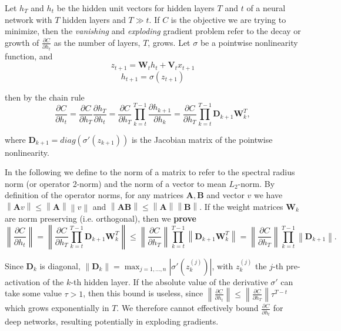 \documentclass{article} %
\newcommand{\matr}[1]{\mathbf{#1}}
\newcommand\norm[1]{\left\lVert#1\right\rVert}
\begin{document}
Let $h_T$ and $h_t$ be the hidden unit vectors for hidden layers $T$ and $t$ of a neural network with 
$T$ hidden layers and $T \gg t$. 
If $C$ is the objective we are trying to minimize, then the {\it{vanishing}} and {\it{exploding}} 
gradient problem refer to the decay or growth of $\frac{\partial C}{\partial h_t}$ as the 
number of layers, $T$, grows. Let $\sigma$ be a pointwise nonlinearity function, and
\begin{equation}
  z_{t+1} = \matr{W}_t h_t + \matr{V}_t x_{t+1}
\label{linoutput}
\end{equation}
\begin{equation}
  h_{t+1} = \sigma (z_{t+1})
\label{nonlinoutput}
\end{equation}

then by the chain rule
\begin{equation}
  \frac{\partial C}{\partial h_t} = \frac{\partial C}{\partial h_T} \frac{\partial h_T}{\partial h_t} 
  = \frac{\partial C}{\partial h_T} \prod_{k=t}^{T-1} \frac{\partial h_{k+1}}{\partial h_k} 
  = \frac{\partial C}{\partial h_T} \prod_{k=t}^{T-1} \matr{D}_{k+1} \matr{W}_k^T ,
\end{equation}

where $\matr{D}_{k+1} = diag(\sigma'(z_{k+1}))$ is the Jacobian matrix of the pointwise nonlinearity.

In the following we define to the norm of a matrix to refer to the spectral radius norm (or operator 2-norm)
and the norm of a vector to mean $L_2$-norm. By definition of the operator norms, 
for any matrices $\matr{A}, \matr{B}$ and vector $v$ we have $\norm{\matr{A}v} \leq \norm{\matr{A}} \norm{v}$ and $\norm{\matr{A}\matr{B}} \leq \norm{\matr{A}} \norm{\matr{B}}$.
If the weight matrices $\matr{W}_k$ are norm preserving (i.e. orthogonal), then we {\bf{prove}}
\begin{equation}
  \norm{ \frac{\partial C}{\partial h_t} } = \norm{ \frac{\partial C}{\partial h_T} 
  \prod_{k=t}^{T-1} \matr{D}_{k+1} \matr{W}_k^T } \leq \norm{\frac{\partial C}{\partial h_T}} 
  \prod_{k=t}^{T-1} \norm{ \matr{D}_{k+1} \matr{W}_k^T } 
  = \norm{ \frac{\partial C}{\partial h_T}} \prod_{k=t}^{T-1} \norm{\matr{D}_{k+1}} .
\label{bound}
\end{equation}

Since $\matr{D}_k$ is diagonal, $\norm{\matr{D}_k} = \max_{j=1, ..., n} |\sigma'(z_k^{(j)})|$,
with $z_k^{(j)}$ the $j$-th pre-activation of the $k$-th hidden layer.
If the absolute value of the derivative $\sigma'$ can take some value $\tau > 1$, then 
this bound is useless, since $\norm{\frac{\partial C}{\partial h_t}} 
\leq \norm{\frac{\partial C}{\partial h_T}} \tau^{T-t}$ which grows exponentially 
in $T$. We therefore cannot effectively bound $\frac{\partial C}{\partial h_t}$ 
for deep networks, resulting potentially in exploding gradients.
\end{document}
